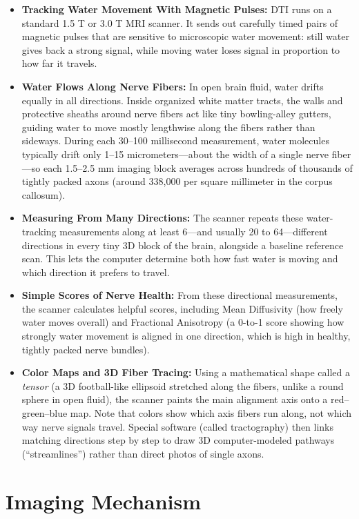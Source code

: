 \begin{itemize}
    \item \textbf{Tracking Water Movement With Magnetic Pulses:} DTI runs on a standard 1.5 T or 3.0 T MRI scanner. It sends out carefully timed pairs of magnetic pulses that are sensitive to microscopic water movement: still water gives back a strong signal, while moving water loses signal in proportion to how far it travels.
    \item \textbf{Water Flows Along Nerve Fibers:} In open brain fluid, water drifts equally in all directions. Inside organized white matter tracts, the walls and protective sheaths around nerve fibers act like tiny bowling-alley gutters, guiding water to move mostly lengthwise along the fibers rather than sideways. During each 30--100 millisecond measurement, water molecules typically drift only 1--15 micrometers---about the width of a single nerve fiber---so each 1.5--2.5 mm imaging block averages across hundreds of thousands of tightly packed axons (around 338,000 per square millimeter in the corpus callosum).
    \item \textbf{Measuring From Many Directions:} The scanner repeats these water-tracking measurements along at least 6---and usually 20 to 64---different directions in every tiny 3D block of the brain, alongside a baseline reference scan. This lets the computer determine both how fast water is moving and which direction it prefers to travel.
    \item \textbf{Simple Scores of Nerve Health:} From these directional measurements, the scanner calculates helpful scores, including Mean Diffusivity (how freely water moves overall) and Fractional Anisotropy (a 0-to-1 score showing how strongly water movement is aligned in one direction, which is high in healthy, tightly packed nerve bundles).
    \item \textbf{Color Maps and 3D Fiber Tracing:} Using a mathematical shape called a \textit{tensor} (a 3D football-like ellipsoid stretched along the fibers, unlike a round sphere in open fluid), the scanner paints the main alignment axis onto a red--green--blue map. Note that colors show which axis fibers run along, not which way nerve signals travel. Special software (called tractography) then links matching directions step by step to draw 3D computer-modeled pathways (``streamlines'') rather than direct photos of single axons.
\end{itemize}

\section{Imaging Mechanism}

